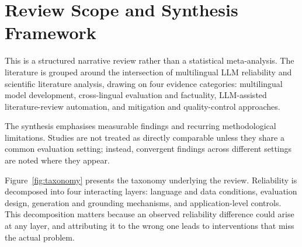 \documentclass[acmsmall,screen,review]{acmart}
\begin{document}
\section{Review Scope and Synthesis Framework}
\label{sec:scope}

This is a structured narrative review rather than a statistical
meta-analysis.  The literature is grouped around the intersection of
multilingual LLM reliability and scientific literature analysis, drawing
on four evidence categories: multilingual model development, cross-lingual
evaluation and factuality, LLM-assisted literature-review automation, and
mitigation and quality-control approaches.

The synthesis emphasises measurable findings and recurring methodological
limitations.  Studies are not treated as directly comparable unless they
share a common evaluation setting; instead, convergent findings across
different settings are noted where they appear.

Figure~\ref{fig:taxonomy} presents the taxonomy underlying the review.
Reliability is decomposed into four interacting layers: language and data
conditions, evaluation design, generation and grounding mechanisms, and
application-level controls.  This decomposition matters because an
observed reliability difference could arise at any layer, and attributing
it to the wrong one leads to interventions that miss the actual problem.
\end{document}
